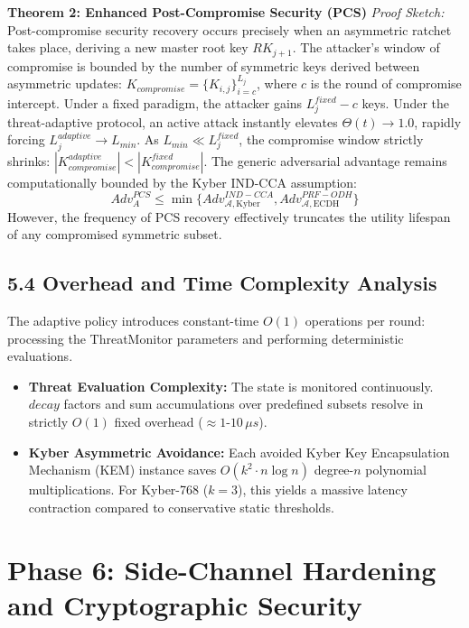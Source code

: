 \documentclass[12pt]{article}
\begin{document}
\textbf{Theorem 2: Enhanced Post-Compromise Security (PCS)}
\textit{Proof Sketch:} Post-compromise security recovery occurs precisely when an asymmetric ratchet takes place, deriving a new master root key $RK_{j+1}$. The attacker's window of compromise is bounded by the number of symmetric keys derived between asymmetric updates: $K_{compromise} = \{K_{i,j}\}_{i=c}^{L_j}$, where $c$ is the round of compromise intercept. Under a fixed paradigm, the attacker gains $L_j^{fixed} - c$ keys. Under the threat-adaptive protocol, an active attack instantly elevates $\Theta(t) \to 1.0$, rapidly forcing $L_j^{adaptive} \to L_{min}$. As $L_{min} \ll L_j^{fixed}$, the compromise window strictly shrinks: $|K_{compromise}^{adaptive}| < |K_{compromise}^{fixed}|$. The generic adversarial advantage remains computationally bounded by the Kyber IND-CCA assumption:
\[
Adv_A^{PCS} \le \min \{Adv_{\mathcal{A},\text{Kyber}}^{IND-CCA}, Adv_{\mathcal{A},\text{ECDH}}^{PRF-ODH}\}
\]
However, the frequency of PCS recovery effectively truncates the utility lifespan of any compromised symmetric subset.

\subsection*{5.4 Overhead and Time Complexity Analysis}

The adaptive policy introduces constant-time $O(1)$ operations per round: processing the ThreatMonitor parameters and performing deterministic evaluations.
\begin{itemize}
    \item \textbf{Threat Evaluation Complexity:} The state is monitored continuously. $decay$ factors and sum accumulations over predefined subsets resolve in strictly $O(1)$ fixed overhead ($\approx 1\text{-}10 \, \mu s$). 
    \item \textbf{Kyber Asymmetric Avoidance:} Each avoided Kyber Key Encapsulation Mechanism (KEM) instance saves $O(k^2 \cdot n \log n)$ degree-$n$ polynomial multiplications. For Kyber-768 ($k=3$), this yields a massive latency contraction compared to conservative static thresholds.
\end{itemize}

\newpage

\section*{Phase 6: Side-Channel Hardening and Cryptographic Security}
\end{document}
